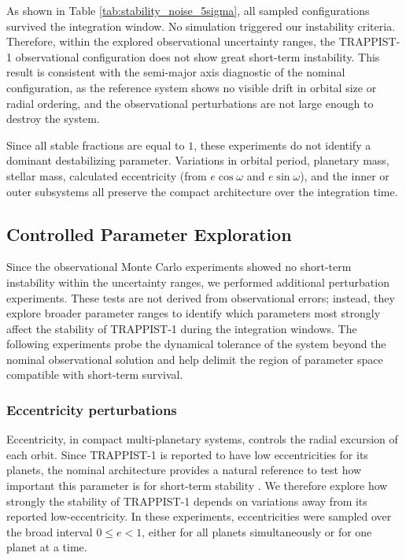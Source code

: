 \documentclass{aa}
\begin{document}
As shown in Table \ref{tab:stability_noise_5sigma}, all sampled configurations survived the integration window. No simulation triggered our instability criteria. Therefore, within the explored observational uncertainty ranges, the TRAPPIST-1 observational configuration does not show great short-term instability. This result is consistent with the semi-major axis diagnostic of the nominal configuration, as the reference system shows no visible drift in orbital size or radial ordering, and the observational perturbations are not large enough to destroy the system.

Since all stable fractions are equal to $1$, these experiments do not identify a dominant destabilizing parameter. Variations in orbital period, planetary mass, stellar mass, calculated eccentricity (from $e\cos\omega$ and $e\sin\omega$), and the inner or outer subsystems all preserve the compact architecture over the integration time. %


\subsection{Controlled Parameter Exploration}
\label{subsec:3.3}

Since the observational Monte Carlo experiments showed no short-term instability within the uncertainty ranges, we performed additional perturbation experiments. These tests are not derived from observational errors; instead, they explore broader parameter ranges to identify which parameters most strongly affect the stability of TRAPPIST-1 during the integration windows. The following experiments probe the dynamical tolerance of the system beyond the nominal observational solution and help delimit the region of parameter space compatible with short-term survival.

\subsubsection{Eccentricity perturbations}

Eccentricity, in compact multi-planetary systems, controls the radial excursion of each orbit. Since TRAPPIST-1 is reported to have low eccentricities for its planets, the nominal architecture provides a natural reference to test how important this parameter is for short-term stability \citep{2021PSJ.....2....1A}. We therefore explore how strongly the stability of TRAPPIST-1 depends on variations away from its reported low-eccentricity. In these experiments, eccentricities were sampled over the broad interval $0 \leq e < 1$, either for all planets simultaneously or for one planet at a time.
\end{document}
